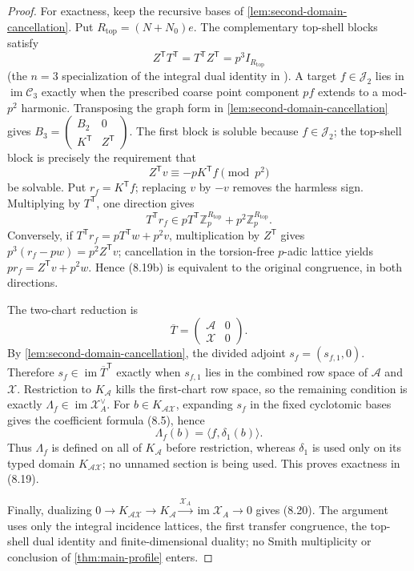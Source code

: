 \documentclass[12pt,a4paper]{article}
\theoremstyle{definition}
\newcommand{\Z}{\mathbb Z}
\newcommand{\im}{\operatorname{im}}
\newcommand{\transpose}{\mathsf T}
\begin{document}
\begin{proof}
For exactness, keep the recursive bases of
\cref{lem:second-domain-cancellation}.  Put
$R_{\mathrm{top}}=(N+N_0)e$.  The complementary top-shell blocks satisfy
\[
 Z^\transpose T^\transpose=T^\transpose Z^\transpose
 =p^3I_{R_{\mathrm{top}}}
\]
(the $n=3$ specialization of the integral dual identity in
\cite[Theorem~8.3, equation~(26)]{BAB26D2}).  A target
$f\in\mathcal J_2$ lies in
$\im\mathcal C_3$ exactly when the prescribed coarse point component
$pf$ extends to a mod-$p^2$ harmonic.  Transposing the graph form in
\cref{lem:second-domain-cancellation} gives
$B_3=\left(\begin{smallmatrix}B_2&0\\K^\transpose&Z^\transpose\end{smallmatrix}\right)$.
The first block is soluble because $f\in\mathcal J_2$; the top-shell block
is precisely the requirement that
\[
 Z^\transpose v\equiv-pK^\transpose f\pmod{p^2}
\]
be solvable.  Put $r_f=K^\transpose f$; replacing $v$ by $-v$ removes
the harmless sign.  Multiplying by $T^\transpose$,
one direction gives
\[
 T^\transpose r_f\in
 pT^\transpose\Z_p^{R_{\mathrm{top}}}
 +p^2\Z_p^{R_{\mathrm{top}}}.
\tag{8.19b}
\]
Conversely, if
$T^\transpose r_f=pT^\transpose w+p^2v$, multiplication by
$Z^\transpose$ gives
$p^3(r_f-pw)=p^2Z^\transpose v$; cancellation in the torsion-free
$p$-adic lattice yields
$pr_f=Z^\transpose v+p^2w$.  Hence (8.19b) is equivalent to the original
congruence, in both directions.

The two-chart reduction is
\[
 \overline T=\begin{pmatrix}\mathcal A&0\\\mathcal X&0\end{pmatrix}.
\]
By \cref{lem:second-domain-cancellation}, the divided adjoint
$s_f=(s_{f,1},0)$.  Therefore $s_f\in\im\overline T^\transpose$ exactly
when $s_{f,1}$ lies in the combined row space of $\mathcal A$ and
$\mathcal X$.  Restriction to $K_{\mathcal A}$ kills the first-chart row
space, so the remaining condition is exactly
$\Lambda_f\in\im\mathcal X_A^\vee$.  For
$b\in K_{\mathcal A\mathcal X}$, expanding $s_f$ in the fixed cyclotomic
bases gives the coefficient formula (8.5), hence
\[
 \Lambda_f(b)=\langle f,\delta_1(b)\rangle.
\]
Thus $\Lambda_f$ is defined on all of $K_{\mathcal A}$ before restriction,
whereas $\delta_1$ is used only on its typed domain
$K_{\mathcal A\mathcal X}$; no unnamed section is being used.  This proves
exactness in (8.19).

Finally, dualizing
$0\to K_{\mathcal A\mathcal X}\to K_{\mathcal A}
\xrightarrow{\mathcal X_A}\im\mathcal X_A\to0$
gives (8.20).  The argument uses only the integral incidence lattices, the
first transfer congruence, the top-shell dual identity and finite-dimensional
duality; no Smith multiplicity or conclusion of \cref{thm:main-profile}
enters.
\end{proof}
\end{document}
